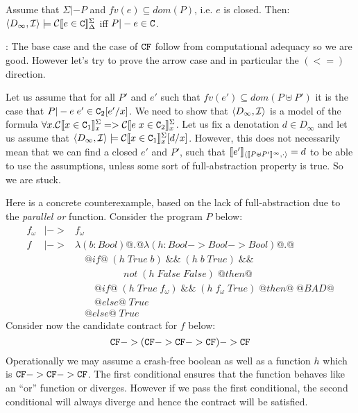 \documentclass[preprint,nocopyrightspace]{sigplanconf}
\begin{document}
\begin{proposition} Assume that $\Sigma |- P$ and $fv(e) \subseteq dom(P)$, i.e. $e$ is closed.
Then: $\langle D_\infty,{\cal I}\rangle \models \ctrans{\Sigma}{\Delta}{e \in \Ct}$ iff $P |- e \in \Ct$.
\end{proposition}

{:}
The base case and the case of $\CF$ follow from computational adequacy so we are good. However
let's try to prove the arrow case and in particular the $(<=)$ direction. 

Let us assume that for all $P'$ and $e'$ such that $fv(e') \subseteq dom(P\uplus P')$ it is the case that
$P |- e\;e' \in \Ct_2[e'/x]$. We need to show that $\langle D_\infty,{\cal I}\rangle$ is a model of the 
formula $\forall x. \ctrans{\Sigma}{x}{x \in \Ct_1} => \ctrans{\Sigma}{x}{e\;x \in \Ct_2}$. Let us fix
a denotation $d \in D_{\infty}$ and let us assume 
that $\langle D_{\infty},{\cal I} \rangle \models \ctrans{\Sigma}{x}{x \in \Ct_1}[d/x]$. However, this does not 
necessarily mean that we can find a closed $e'$ and $P'$, such 
that $\interp{e'}{\dbrace{P{\uplus}P'}^\infty}{\cdot} = d$ to be able to use the assumptions, unless some sort
of full-abstraction property is true. So we are stuck.

Here is a concrete counterexample, based on the lack of full-abstraction due to the {\em parallel or} function. 
Consider the program $P$ below:
\[\begin{array}{lcl}
f_\omega & |-> & f_\omega \\
f & |-> & \lambda (b{:}Bool) @.@ \lambda (h{:}Bool->Bool->Bool) @.@ \\
  &     & \quad @if@\;(h\;True\;b)\;\&\&\;(h\;b\;True)\;\&\& \\ 
  &     & \quad\qquad\qquad not\;(h\;False\;False)\;@then@ \\
  &     & \quad\quad @if@\;(h\;True\;f_\omega)\;\&\&\;(h\;f_\omega\;True)\;@then@\;@BAD@ \\
  &     & \quad\quad @else@\;True \\
  &     & \quad @else@\;True
\end{array}\]
Consider now the candidate contract for $f$ below: 
\[ \CF -> (\CF -> \CF -> \CF) -> \CF \]
Operationally we may assume a crash-free boolean as well as a function $h$ which is 
$\CF -> \CF -> \CF$. The first conditional ensures that the function behaves like an ``or'' function or 
diverges. However if we pass the first conditional, 
the second conditional will always diverge and hence the contract will be satisfied. 
\end{document}
